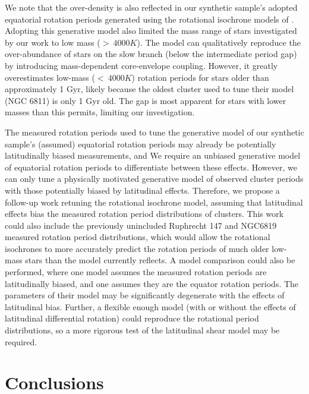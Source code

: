 We note that the over-density is also reflected in our synthetic sample's adopted equatorial rotation periods generated using the rotational isochrone models of \citet{spada_competing_2020}.
Adopting this generative model also limited the mass range of stars investigated by our work to low mass ($> \ 4000 K$).
The model can qualitatively reproduce the over-abundance of stars on the slow branch (below the intermediate period gap) by introducing mass-dependent core-envelope coupling.
However, it greatly overestimates low-mass ($< \ 4000 K$) rotation periods for stars older than approximately 1 Gyr, likely because the oldest cluster used to tune their model (NGC 6811) is only 1 Gyr old. 
The gap is most apparent for stars with lower masses than this permits, limiting our investigation.

The measured rotation periods used to tune the generative model of our synthetic sample's (assumed) equatorial rotation periods may already be potentially latitudinally biased measurements, and 
We require an unbiased generative model of equatorial rotation periods to differentiate between these effects.
However, we can only tune a physically motivated generative model of observed cluster periods with those potentially biased by latitudinal effects.
Therefore, we propose a follow-up work retuning the rotational isochrone model, assuming that latitudinal effects bias the measured rotation period distributions of clusters.
This work could also include the previously unincluded Ruphrecht 147 \citep{curtis_when_2020} and NGC6819 \citep{meibom_kepler_2011} measured rotation period distributions, which would allow the rotational isochrones to more accurately predict the rotation periods of much older low-mass stars than the model currently reflects.
A model comparison could also be performed, where one model assumes the measured rotation periods are latitudinally biased, and one assumes they are the equator rotation periods.
The parameters of their model may be significantly degenerate with the effects of latitudinal bias.
Further, a flexible enough model (with or without the effects of latitudinal differential rotation) could reproduce the rotational period distributions, so a more rigorous test of the latitudinal shear model may be required.


\section{Conclusions}
\label{sec:conclusione}

